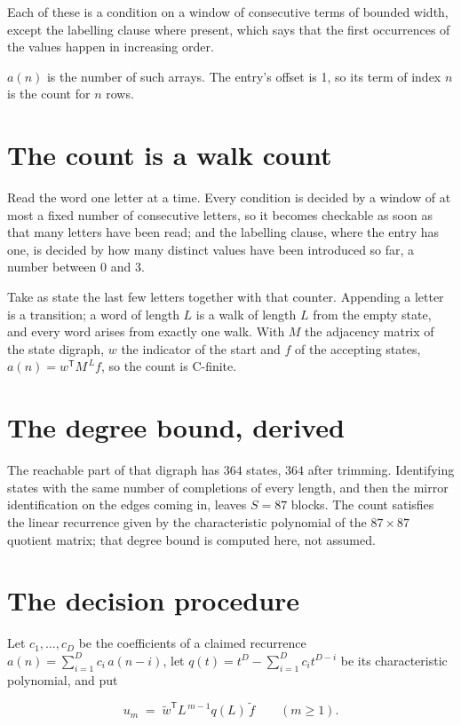 \documentclass[11pt]{article}
\theoremstyle{definition}
\begin{document}
Each of these is a condition on a window of consecutive terms of bounded width, except the labelling clause where present, which says that the first occurrences of the values happen in increasing order.

$a(n)$ is the number of such arrays. The entry's offset is 1, so its term of index $n$ is the count for $n$ rows.

\section{The count is a walk count}

Read the word one letter at a time. Every condition is decided by a window of at most a fixed number of consecutive letters, so it becomes checkable as soon as that many letters have been read; and the labelling clause, where the entry has one, is decided by how many distinct values have been introduced so far, a number between $0$ and 3.

Take as state the last few letters together with that counter. Appending a letter is a transition; a word of length $L$ is a walk of length $L$ from the empty state, and every word arises from exactly one walk. With $M$ the adjacency matrix of the state digraph, $w$ the indicator of the start and $f$ of the accepting states, $a(n) = w^{\mathsf T}M^{\,L}f$, so the count is C-finite.

\section{The degree bound, derived}

The reachable part of that digraph has $364$ states, $364$ after trimming. Identifying states with the same number of completions of every length, and then the mirror identification on the edges coming in, leaves $S = 87$ blocks. The count satisfies the linear recurrence given by the characteristic polynomial of the $87\times87$ quotient matrix; that degree bound is computed here, not assumed.

\section{The decision procedure}

Let $c_1,\dots,c_D$ be the coefficients of a claimed recurrence $a(n) = \sum_{i=1}^{D} c_i\,a(n-i)$, let $q(t) = t^{D} - \sum_{i=1}^{D} c_i t^{D-i}$ be its characteristic polynomial, and put

\[u_m \;=\; \tilde w^{\mathsf T} L^{\,m-1} q(L)\,\tilde f \qquad (m \ge 1).\]
\end{document}
